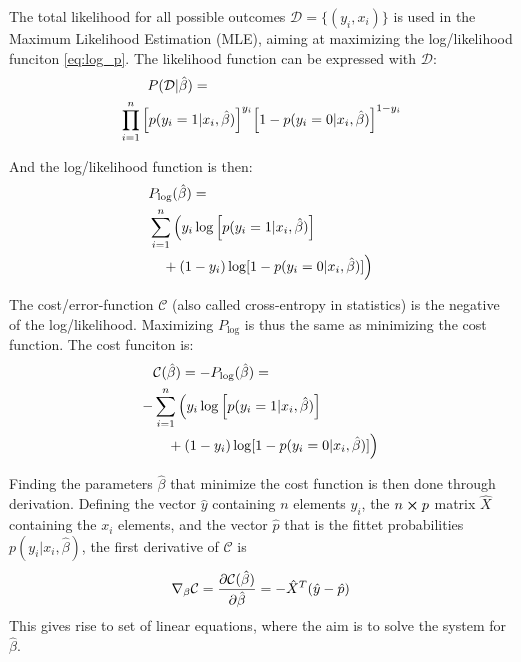 The total likelihood for all possible outcomes $\mathcal{D}=\{(y_i,x_i)\}$ is used in the Maximum Likelihood Estimation (MLE), aiming at maximizing the log/likelihood funciton \eqref{eq:log_p}. The likelihood function can be expressed with $\mathcal{D}$:
\begin{equation*}
\begin{split}
    &\qquad P(\mathcal{D}|\hat{\beta}) = \\
    &\prod_{i=1}^n \qty[p(y_i = 1|x_i,\hat{\beta}) ]^{y_i}  \qty[1 - p(y_i = 0|x_i,\hat{\beta})]^{1-y_i}
\end{split}
\end{equation*}

And the log/likelihood function is then:
\begin{equation}
\begin{split}
    &P_{\log}(\hat{\beta}) = \\
    &\sum_{i=1}^n \Big(y_i \log \qty[p(y_i = 1|x_i,\hat{\beta})] \\
    &\quad+ (1-y_i) \log [1 - p(y_i = 0|x_i,\hat{\beta})]\Big)
\end{split}
\label{eq:log_p}
\end{equation}

The cost/error-function $\mathcal{C}$ (also called cross-entropy in statistics) is the negative of the log/likelihood. Maximizing $P_{\log}$ is thus the same as minimizing the cost function. The cost funciton is:
\begin{equation}
  \begin{split}
    &\mathcal{C}(\hat{\beta}) = - P_{\log}(\hat{\beta}) =  \\
    -&\sum_{i=1}^n \Big(y_i \log \qty[p(y_i = 1|x_i,\hat{\beta})] \\
    &\quad+ (1-y_i) \log [1 - p(y_i = 0|x_i,\hat{\beta})]\Big)
  \end{split}
  \label{eq:cost_function}
\end{equation}

Finding the parameters $\hat{\beta}$ that minimize the cost function is then done through derivation.
Defining the vector $\hat{y}$ containing $n$ elements $y_i$, the $n \cross p$ matrix $\hat{X}$ containing the $x_i$ elements, and the vector $\hat{p}$ that is the fittet probabilities $p(y_i|x_i,\hat{\beta})$, the first derivative of $\mathcal{C}$ is
\begin{equation}
  \nabla_\beta \mathcal{C} = \pdv{\mathcal{C}(\hat{\beta})}{\hat{\beta}} = - \hat{X}^T (\hat{y}-\hat{p})
  \label{eq:cost_d}
\end{equation}
This gives rise to set of linear equations, where the aim is to solve the system for $\hat{\beta}$.


